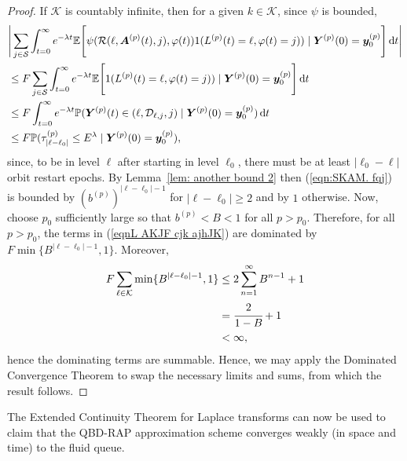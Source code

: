\begin{proof}
	If \(\mathcal K\) is countably infinite, then for a given \(k\in\mathcal K\), since \(\psi\) is bounded,
	\begin{align}
		&\Bigg|\sum_{j\in\mathcal S}\int_{t=0}^\infty e^{-\lambda t}\mathbb E\Bigg[\psi( \mathcal R(\ell,\boldsymbol A^{(p)}(t),j),\varphi(t) )  1({L}^{(p)}(t)=\ell,\varphi(t)=j))  \mid \nonumber
		\boldsymbol Y^{(p)}(0)=\boldsymbol y_0^{(p)} \Bigg] \, \mathrm{d} t\Bigg| \nonumber 
		\\&\leq F \sum_{j\in\mathcal S}\int_{t=0}^\infty e^{-\lambda t}\mathbb E\Bigg[1({L}^{(p)}(t)=\ell,\varphi(t)=j))  \mid \nonumber
		\boldsymbol Y^{(p)}(0)=\boldsymbol y_0^{(p)}\Bigg] \, \mathrm{d} t \nonumber 
		\\&\leq F  \int_{t=0}^\infty e^{-\lambda t}\mathbb P( {\boldsymbol Y}^{(p)}(t)\in(\ell,\mathcal D_{\ell,j},j) \mid   
		\boldsymbol Y^{(p)}(0)=\boldsymbol y_0^{(p)})\, \mathrm{d} t \nonumber 
		\\&\leq F \mathbb P(\tau_{|\ell-\ell_0|}^{(p)}\leq E^\lambda \mid
			\boldsymbol Y^{(p)}(0)=\boldsymbol y_0^{(p)}), \label{eqn:SKAM. fqj}
	\end{align}
	since, to be in level \(\ell\) after starting in level \(\ell_0\), there must be at least \(|\ell_0-\ell|\) orbit restart epochs. By Lemma~\ref{lem: another bound 2} then (\ref{eqn:SKAM. fqj}) is bounded by \(\left(b^{(p)}\right)^{|\ell-\ell_0|-1}\) for \(|\ell-\ell_0|\geq 2\) and by \(1\) otherwise. Now, choose \(p_0\) sufficiently large so that \(b^{(p)}<B<1\) for all \(p>p_0\). Therefore, for all \(p>p_0\), the terms in (\ref{eqnL AKJF cjk ajhJK}) are dominated by \(F\min\{B^{|\ell-\ell_0|-1},1\}\). Moreover, 
	\begin{align*}
		F\sum_{\ell\in\mathcal K} \min\{B^{|\ell-\ell_0|-1},1\} 
		&\leq2\sum_{n=1}^\infty B^{n-1}+1
		\\&=\cfrac{2}{1-B}+1
		\\&<\infty,
	\end{align*}
	hence the dominating terms are summable. Hence, we may apply the Dominated Convergence Theorem to swap the necessary limits and sums, from which the result follows.
\end{proof} 

The Extended Continuity Theorem for Laplace transforms \cite[Chapter XIII, Theorem 2a]{feller1957} can now be used to claim that the QBD-RAP approximation scheme converges weakly (in space and time) to the fluid queue. 

